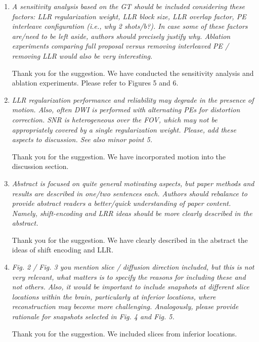 \documentclass[a4paper,11pt,twoside]{report}
\begin{document}
\begin{enumerate}
    \item \textit{A sensitivity analysis based on the GT should be included considering these factors: LLR regularization weight, LLR block size, LLR overlap factor, PE interleave configuration (i.e., why 2 shots/b?). In case some of these factors are/need to be left aside, authors should precisely justify why. Ablation experiments comparing full proposal versus removing interleaved PE / removing LLR would also be very interesting.}

    \hspace{1em} Thank you for the suggestion.
    We have conducted the sensitivity analysis and ablation experiments.
    Please refer to Figures 5 and 6.

    \item \textit{LLR regularization performance and reliability may degrade in the presence of motion. Also, often DWI is performed with alternating PEs for distortion correction. SNR is heterogeneous over the FOV, which may not be appropriately covered by a single regularization weight. Please, add these aspects to discussion. See also minor point 5.}

    \hspace{1em} Thank you for the suggestion.
    We have incorporated motion into the discussion section.

    \item \textit{Abstract is focused on quite general motivating aspects, but paper methods and results are described in one/two sentences each. Authors should rebalance to provide abstract readers a better/quick understanding of paper content. Namely, shift-encoding and LRR ideas should be more clearly described in the abstract.}

    \hspace{1em} Thank you for the suggestion. We have clearly described
    in the abstract the ideas of shift encoding and LLR.

    \item \textit{Fig. 2 / Fig. 3 \textrightarrow you mention slice / diffusion direction included, but this is not very relevant, what matters is to specify the reasons for including these and not others. Also, it would be important to include snapshots at different slice locations within the brain, particularly at inferior locations, where reconstruction may become more challenging. Analogously, please provide rationale for snapshots selected in Fig. 4 and Fig. 5.}

    \hspace{1em} Thank you for the suggestion.
    We included slices from inferior locations.


\end{enumerate}
\end{document}
